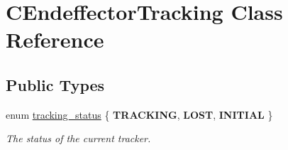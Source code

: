 \hypertarget{classCEndeffectorTracking}{\section{\-C\-Endeffector\-Tracking \-Class \-Reference}
\label{classCEndeffectorTracking}
}
\subsection*{\-Public \-Types}
\begin{DoxyCompactItemize}
\item 
enum \hyperlink{classCEndeffectorTracking_a2d651924613cfab97e971e08980be55e}{tracking\-\_\-status} \{ {\bfseries \-T\-R\-A\-C\-K\-I\-N\-G}, 
{\bfseries \-L\-O\-S\-T}, 
{\bfseries \-I\-N\-I\-T\-I\-A\-L}
 \}
\begin{DoxyCompactList}\small\item\em \-The status of the current tracker. \end{DoxyCompactList}\end{DoxyCompactItemize}
